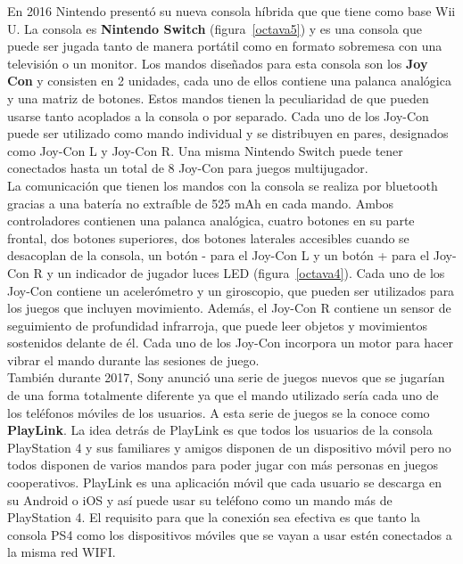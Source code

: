 En 2016 Nintendo present\'o su nueva consola h\'ibrida que que tiene como base Wii U. La consola es \textbf{Nintendo Switch} (figura~\ref{octava5}) y es una consola que puede ser jugada tanto de manera port\'atil como en formato sobremesa con una televisi\'on o un monitor. Los mandos dise\~nados para esta consola son los \textbf{Joy Con} y consisten en 2 unidades, cada uno de ellos contiene una palanca anal\'ogica y una matriz de botones. Estos mandos tienen la peculiaridad de que pueden usarse tanto acoplados a la consola o por separado. Cada uno de los Joy-Con puede ser utilizado como mando individual y se distribuyen en pares, designados como Joy-Con L y Joy-Con R. Una misma Nintendo Switch puede tener conectados hasta un total de 8 Joy-Con para juegos multijugador.\\

La comunicaci\'on que tienen los mandos con la consola se realiza por bluetooth gracias a una bater\'ia no extra\'ible de 525 mAh en cada mando. Ambos controladores contienen una palanca anal\'ogica, cuatro botones en su parte frontal, dos botones superiores, dos botones laterales accesibles cuando se desacoplan de la consola, un bot\'on - para el Joy-Con L y un bot\'on + para el Joy-Con R y un indicador de jugador luces LED (figura~\ref{octava4}). Cada uno de los Joy-Con contiene un aceler\'ometro y un giroscopio, que pueden ser utilizados para los juegos que incluyen movimiento. Adem\'as, el Joy-Con R contiene un sensor de seguimiento de profundidad infrarroja, que puede leer objetos y movimientos sostenidos delante de \'el. Cada uno de los Joy-Con incorpora un motor para hacer vibrar el mando durante las sesiones de juego.\\

Tambi\'en durante 2017, Sony anunci\'o una serie de juegos nuevos que se jugar\'ian de una forma totalmente diferente ya que el mando utilizado ser\'ia cada uno de los tel\'efonos m\'oviles de los usuarios. A esta serie de juegos se la conoce como \textbf{PlayLink}. La idea detr\'as de PlayLink es que todos los usuarios de la consola PlayStation 4 y sus familiares y amigos disponen de un dispositivo m\'ovil pero no todos disponen de varios mandos para poder jugar con m\'as personas en juegos cooperativos. PlayLink es una aplicaci\'on m\'ovil que cada usuario se descarga en su Android o iOS y as\'i puede usar su tel\'efono como un mando m\'as de PlayStation 4. El requisito para que la conexi\'on sea efectiva es que tanto la consola PS4 como los dispositivos m\'oviles que se vayan a usar est\'en conectados a la misma red WIFI.\\

